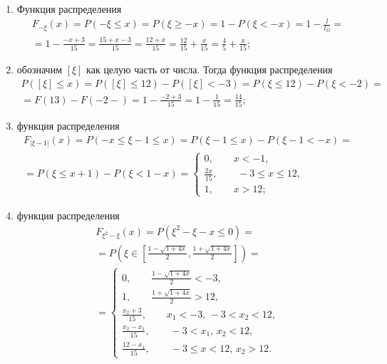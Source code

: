 \begin{enumerate}[label=\alph*)]
\item Функция распределения
\begin{equation*}
\begin{split}
F_{- \xi } \left( x \right) =
P \left( - \xi \leq x \right) =
P \left( \xi \geq -x \right) =
1 - P \left( \xi < -x \right) =
1 - \frac{l}{l_{ \Omega }} = \\
= 1 - \frac{-x+3}{15} =
\frac{15+x-3}{15} =
\frac{12+x}{15} =
\frac{12}{15} + \frac{x}{15} =
\frac{4}{5} + \frac{x}{15};
\end{split}
\end{equation*}
\item обозначим $ \left[ \xi \right] $ как целую часть от числа.
Тогда функция распределения
\begin{equation*}
\begin{split}
P \left( \left[ \xi \right] \leq x \right) =
P \left( \left[ \xi \right] \leq 12 \right) - P \left( \left[ \xi \right] < -3 \right) =
P \left( \xi \leq 12 \right) - P \left( \xi < -2 \right) = \\
= F \left( 13 \right) - F \left( -2- \right) =
1 - \frac{-2+3}{15} =
1 - \frac{1}{15} =
\frac{14}{15};
\end{split}
\end{equation*}
\item функция распределения
\begin{equation*}
\begin{split}
F_{ \left| \xi - 1 \right| } \left( x \right) =
P \left( -x \leq \xi - 1 \leq x \right) =
P \left( \xi - 1 \leq x \right) - P \left( \xi - 1 < - x \right) = \\
= P \left( \xi \leq x + 1 \right) - P \left( \xi < 1 - x \right) =
\begin{cases}
0, \qquad x < -1, \\
\frac{2x}{15}, \qquad -3 \leq x \leq 12, \\
1, \qquad x > 12;
\end{cases}
\end{split}
\end{equation*}
\item функция распределения
\begin{equation*}
\begin{split}
F_{\xi^2 - \xi} \left( x \right) =
P \left( \xi^2 - \xi - x \leq 0 \right) = \\
= P \left( \xi \in \left[ \frac{1 - \sqrt{1+4x}}{2}, \frac{1 + \sqrt{1+4x}}{2} \right] \right) = \\
= \begin{cases}
0, \qquad \frac{1 - \sqrt{1+4x}}{2} < -3, \\
1, \qquad \frac{1 + \sqrt{1+4x}}{2} > 12, \\
\frac{x_2+3}{15}, \qquad x_1 < -3, \, -3 < x_2 < 12, \\
\frac{x_2 - x_1}{15}, \qquad -3 < x_1, \, x_2 < 12, \\
\frac{12 - x_1}{15}, \qquad -3 \leq x < 12, \, x_2 > 12.
\end{cases}
\end{split}
\end{equation*}
\end{enumerate}

